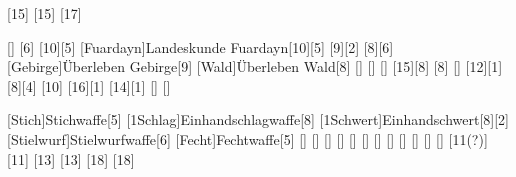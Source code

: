 \documentclass{m5figur-mv}[2014/01/16]
\begin{document}
{[15]
[15]
[17]




[]{}%
[6]
[10][5]
[Fuardayn]{Landeskunde Fuardayn}[10][5]%
[9][2]
[8][6]
[Gebirge]{Überleben Gebirge}[9]
[Wald]{Überleben Wald}[8]
[]{}
[]{}
[]{}
[15][8]
[8]
[]{}
[12][1]
[8][4]
[10]
[16][1]
[14][1]
[]{}
[]{}



[Stich]{Stichwaffe}[5]
[1Schlag]{Einhandschlagwaffe}[8]
[1Schwert]{Einhandschwert}[8][2]
[Stielwurf]{Stielwurfwaffe}[6]
[Fecht]{Fechtwaffe}[5]
[]{}
[]{}
[]{}
[]{}
[]{}
[]{}
[]{}
[]{}
[]{}
[]{}
[]{}
[]{}
[11(?)]
[11]
[13]
[13]
[18]
[18]


}
\end{document}
